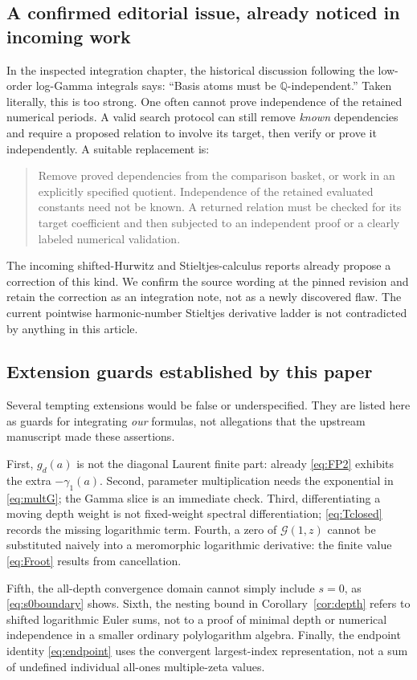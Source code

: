 \documentclass[11pt]{article}
\numberwithin{equation}{section}
\theoremstyle{definition}\newtheorem{definition}[theorem]{Definition}
\theoremstyle{remark}\newtheorem{remark}[theorem]{Remark}
\newcommand{\G}{\mathcal G}\newcommand{\F}{\mathfrak F}
\begin{document}
\subsection{A confirmed editorial issue, already noticed in incoming work}
In the inspected integration chapter, the historical discussion following
the low-order log-Gamma integrals says: ``Basis atoms must be
$\mathbb Q$-independent.'' Taken literally, this is too strong. One often
cannot prove independence of the retained numerical periods. A valid search
protocol can still remove \emph{known} dependencies and require a proposed
relation to involve its target, then verify or prove it independently.
A suitable replacement is:
\begin{quote}
Remove proved dependencies from the comparison basket, or work in an
explicitly specified quotient. Independence of the retained evaluated
constants need not be known. A returned relation must be checked for its
target coefficient and then subjected to an independent proof or a clearly
labeled numerical validation.
\end{quote}
The incoming shifted-Hurwitz and Stieltjes-calculus reports already propose
a correction of this kind. We confirm the source wording at the pinned
revision and retain the correction as an integration note, not as a newly
discovered flaw. The current pointwise harmonic-number Stieltjes derivative
ladder is not contradicted by anything in this article.

\subsection{Extension guards established by this paper}
Several tempting extensions would be false or underspecified. They are
listed here as guards for integrating \emph{our} formulas, not allegations
that the upstream manuscript made these assertions.

First, $g_d(a)$ is not the diagonal Laurent finite part: already
\eqref{eq:FP2} exhibits the extra $-\gamma_1(a)$. Second, parameter
multiplication needs the exponential in \eqref{eq:multG}; the Gamma slice
is an immediate check. Third, differentiating a moving depth weight is not
fixed-weight spectral differentiation; \eqref{eq:Tclosed} records the
missing logarithmic term. Fourth, a zero of $\G(1,z)$ cannot be substituted
naively into a meromorphic logarithmic derivative: the finite value
\eqref{eq:Froot} results from cancellation.

Fifth, the all-depth convergence domain cannot simply include $s=0$,
as \eqref{eq:s0boundary} shows. Sixth, the nesting bound in
Corollary~\ref{cor:depth} refers to shifted logarithmic Euler sums, not to a
proof of minimal depth or numerical independence in a smaller ordinary
polylogarithm algebra. Finally, the endpoint identity \eqref{eq:endpoint}
uses the convergent largest-index representation, not a sum of undefined
individual all-ones multiple-zeta values.
\end{document}
